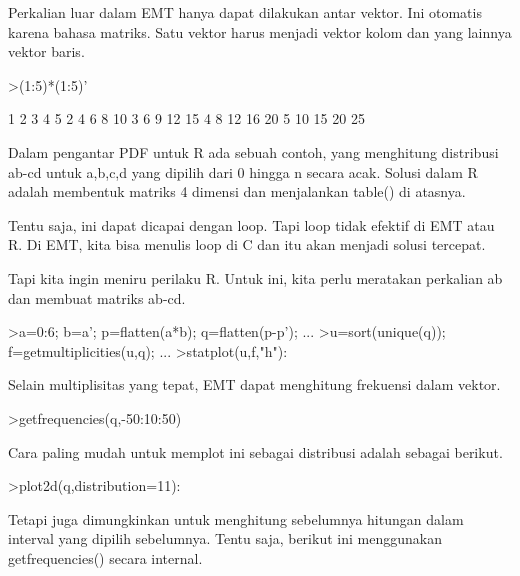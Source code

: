 \documentclass{article}
\begin{document}
\begin{eulernotebook}
\begin{eulercomment}
\begin{eulercomment}
\begin{eulercomment}
Perkalian luar dalam EMT hanya dapat dilakukan antar vektor. Ini
otomatis karena bahasa matriks. Satu vektor harus menjadi vektor kolom
dan yang lainnya vektor baris.
\end{eulercomment}
\begin{eulerprompt}
>(1:5)*(1:5)'
\end{eulerprompt}
\begin{euleroutput}
          1         2         3         4         5 
          2         4         6         8        10 
          3         6         9        12        15 
          4         8        12        16        20 
          5        10        15        20        25 
\end{euleroutput}
\begin{eulercomment}
Dalam pengantar PDF untuk R ada sebuah contoh, yang menghitung
distribusi ab-cd untuk a,b,c,d yang dipilih dari 0 hingga n secara
acak. Solusi dalam R adalah membentuk matriks 4 dimensi dan
menjalankan table() di atasnya.

Tentu saja, ini dapat dicapai dengan loop. Tapi loop tidak efektif di
EMT atau R. Di EMT, kita bisa menulis loop di C dan itu akan menjadi
solusi tercepat.

Tapi kita ingin meniru perilaku R. Untuk ini, kita perlu meratakan
perkalian ab dan membuat matriks ab-cd.
\end{eulercomment}
\begin{eulerprompt}
>a=0:6; b=a'; p=flatten(a*b); q=flatten(p-p'); ...
>u=sort(unique(q)); f=getmultiplicities(u,q); ...
>statplot(u,f,"h"):
\end{eulerprompt}
\begin{eulercomment}
Selain multiplisitas yang tepat, EMT dapat menghitung frekuensi dalam
vektor.
\end{eulercomment}
\begin{eulerprompt}
>getfrequencies(q,-50:10:50)
\end{eulerprompt}
\begin{euleroutput}
  [0,  23,  132,  316,  602,  801,  333,  141,  53,  0]
\end{euleroutput}
\begin{eulercomment}
Cara paling mudah untuk memplot ini sebagai distribusi adalah sebagai
berikut.
\end{eulercomment}
\begin{eulerprompt}
>plot2d(q,distribution=11):
\end{eulerprompt}
\begin{eulercomment}
Tetapi juga dimungkinkan untuk menghitung sebelumnya hitungan dalam
interval yang dipilih sebelumnya. Tentu saja, berikut ini menggunakan
getfrequencies() secara internal.


\end{eulercomment}
\end{eulercomment}
\end{eulercomment}
\end{eulernotebook}
\end{document}
